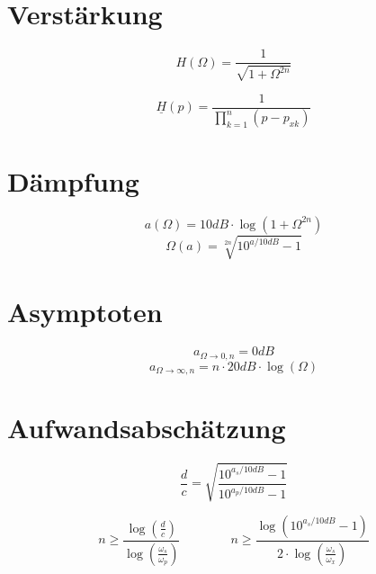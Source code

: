 \documentclass[a4paper, 12pt]{report}
\begin{document}
\section*{Verstärkung}
	\vspace{-0.3cm}
    \begin{minipage}[t]{0.5\textwidth}
	    \[ H(\Omega) = \frac{1}{\sqrt{1 + \Omega^{2n}}} \]
    \end{minipage}
    \begin{minipage}[t]{0.5\textwidth}
	    \[ \underline{H}(p) = \frac{1}{\prod_{k=1}^n \left(p - p_{xk}\right)} \]
    \end{minipage}
    
    \vspace{0.5cm}
    
	\begin{minipage}[t]{0.5\textwidth}
  		\section*{Dämpfung}
		\[ a(\Omega) = 10dB \cdot \log{\left(1 + \Omega^{2n}\right)} \]
		\[ \Omega(a) = \sqrt[2n]{10^{a / 10dB} - 1} \]
	\end{minipage}
	\begin{minipage}[t]{0.5\textwidth}
		 \section*{Asymptoten}
		  \[ a_{\Omega\rightarrow 0,n} = 0dB \]
		  \[ a_{\Omega\rightarrow \infty,n} = n \cdot 20dB \cdot \log{(\Omega)} \]
	\end{minipage}
	
   	
\section*{Aufwandsabschätzung}
	\vspace{-0.5cm}
   	\begin{minipage}[t]{0.5\textwidth}
		\[ \frac{d}{c} = \sqrt{\frac{10^{a_s/10dB} - 1}{10^{a_p/10dB} - 1}} \]
   	\end{minipage}
   	\begin{minipage}[t]{0.5\textwidth}
   		\vspace{-0.5cm}
		\[ n \ge \frac{\log{\left(\frac{d}{c}\right)}}{\log{\left(\frac{\omega_s}{\omega_p}\right)}} \qquad \qquad n \ge \frac{\log{\left(10^{a_s/10dB}-1\right)}}{2 \cdot \log{\left(\frac{\omega_s}{\omega_x}\right)}}\]
   	\end{minipage}
\end{document}
